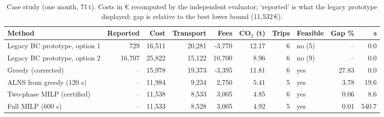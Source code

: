 \begin{table}[t]\centering\small\setlength{\tabcolsep}{4pt}
\caption{Case study (one month, 71\,t). Costs in \euro{{}} recomputed by the independent evaluator; `reported' is what the legacy prototype displayed; gap is relative to the best lower bound (11,532\,\euro).}\label{tab:case}
\begin{tabular}{lrrrrrrlrr}\toprule
Method & Reported & Cost & Transport & Fees & CO$_2$ (t) & Trips & Feasible & Gap \% & s\\\midrule
Legacy BC prototype, option 1 & 729 & 16,511 & 20,281 & -3,770 & 12.17 & 6 & no (5) & -- & 0.0\\
Legacy BC prototype, option 2 & 16,707 & 25,822 & 15,122 & 10,700 & 8.96 & 6 & no (9) & -- & 0.0\\
Greedy (corrected) & -- & 15,978 & 19,373 & -3,395 & 11.81 & 6 & yes & 27.83 & 0.0\\
ALNS from greedy (120 s) & -- & 11,984 & 9,234 & 2,750 & 5.41 & 5 & yes & 3.78 & 19.6\\
Two-phase MILP (certified) & -- & 11,538 & 8,533 & 3,005 & 4.85 & 6 & yes & 0.06 & 8.6\\
Full MILP (600 s) & -- & 11,533 & 8,528 & 3,005 & 4.92 & 5 & yes & 0.01 & 540.7\\
\bottomrule\end{tabular}\end{table}

